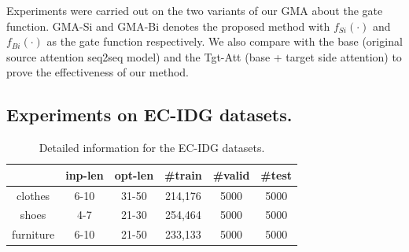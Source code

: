 \documentclass[letterpaper]{article} %
\begin{document}
Experiments were carried out on the two variants of our GMA about the gate function. GMA-Si and GMA-Bi denotes the proposed method with $f_{Si}(\cdot)$ and $f_{Bi}(\cdot)$ as the gate function respectively. We also compare with the base (original source attention seq2seq model) and the Tgt-Att (base + target side attention) to prove the effectiveness of our method.

\subsection{Experiments on EC-IDG datasets.}

\begin{table}[h]
\renewcommand\arraystretch{1.1}
\small
\vspace{1mm}
\begin{tabular}{c|c|c|c|c|c}
\hline
          & inp-len & opt-len & \#train & \#valid  & \#test \\ \hline
clothes   & 6-10         & 31-50         & 214,176   & 5000      & 5000     \\ \hline 
shoes     & 4-7          & 21-30         & 254,464   & 5000      & 5000     \\ \hline
furniture & 6-10         & 21-50         & 233,133   & 5000      & 5000    \\ \hline
\end{tabular}
\caption{Detailed information for the EC-IDG datasets.}
\label{table:IDG dataset}
\end{table}
\end{document}
